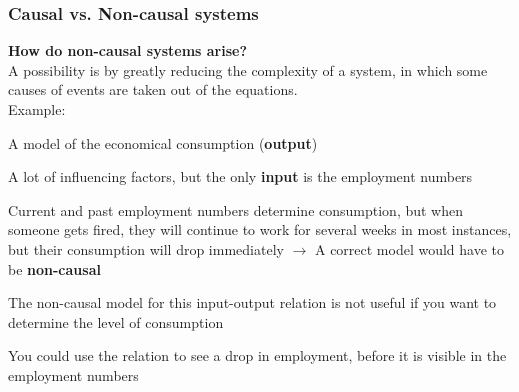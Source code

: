 \documentclass{beamer}
\begin{document}
	\begin{frame}
		\frametitle{Causal vs. Non-causal systems}
		\textbf{How do non-causal systems arise?}\\
		\medskip
		A possibility is by greatly reducing the complexity of a system, in which some causes of events are taken out of the equations.\\
		Example:\\
		\begin{itemize}
			\small{
				\item A model of the economical consumption (\textbf{output})
				\item A lot of influencing factors, but the only \textbf{input} is the employment numbers
				\item Current and past employment numbers determine consumption, but when someone gets fired, they will continue to work for several weeks in most instances, but their consumption will drop immediately
				$\rightarrow$ A correct model would have to be \textbf{non-causal}
				\item The non-causal model for this input-output relation is not useful if you want to determine the level of consumption
				\item You could use the relation to see a drop in employment, before it is visible in the employment numbers}
		\end{itemize}
	\end{frame}
	
	
\end{document}
